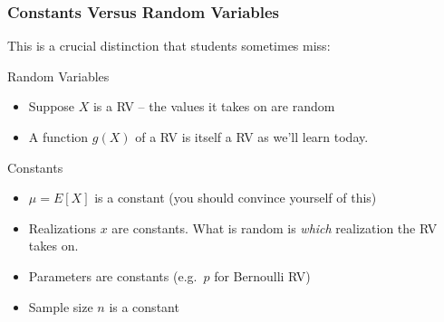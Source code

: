 \documentclass[handout]{beamer}
\begin{document}
\begin{frame}
\frametitle{Constants Versus Random Variables}

 \alert{This is a crucial distinction that students sometimes miss:}
 \vspace{1em}
 

 		\begin{block}{Random Variables}
 			\begin{itemize}
 			\item Suppose $X$ is a RV -- the values it takes on are random
 			\item A function $g(X)$ of a RV is itself a RV as we'll learn today.
 			\end{itemize}
 		\end{block}
 
 		\begin{block}{Constants}
 			\begin{itemize}
 				\item $\mu = E[X]$ is a constant (you should convince yourself of this)
 				\item Realizations $x$ are constants. What is random is \emph{which} realization the RV takes on.
 				\item Parameters are constants (e.g.\ $p$ for Bernoulli RV)
 				\item Sample size $n$ is a constant
 			\end{itemize}
 		\end{block} 

\end{frame}
\end{document}
